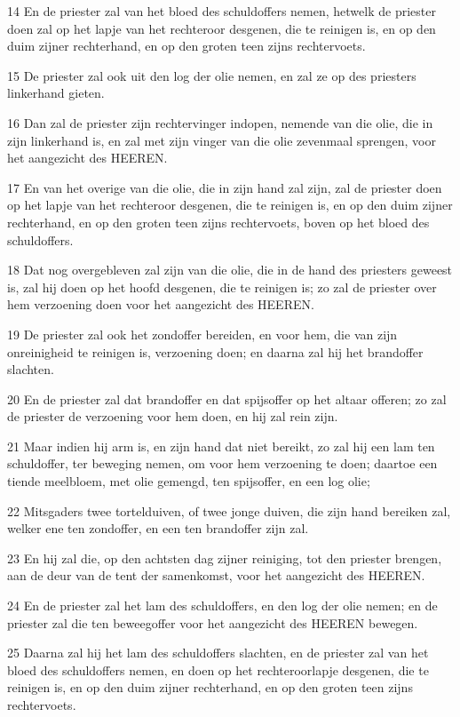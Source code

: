 \par 14 En de priester zal van het bloed des schuldoffers nemen, hetwelk de priester doen zal op het lapje van het rechteroor desgenen, die te reinigen is, en op den duim zijner rechterhand, en op den groten teen zijns rechtervoets.
\par 15 De priester zal ook uit den log der olie nemen, en zal ze op des priesters linkerhand gieten.
\par 16 Dan zal de priester zijn rechtervinger indopen, nemende van die olie, die in zijn linkerhand is, en zal met zijn vinger van die olie zevenmaal sprengen, voor het aangezicht des HEEREN.
\par 17 En van het overige van die olie, die in zijn hand zal zijn, zal de priester doen op het lapje van het rechteroor desgenen, die te reinigen is, en op den duim zijner rechterhand, en op den groten teen zijns rechtervoets, boven op het bloed des schuldoffers.
\par 18 Dat nog overgebleven zal zijn van die olie, die in de hand des priesters geweest is, zal hij doen op het hoofd desgenen, die te reinigen is; zo zal de priester over hem verzoening doen voor het aangezicht des HEEREN.
\par 19 De priester zal ook het zondoffer bereiden, en voor hem, die van zijn onreinigheid te reinigen is, verzoening doen; en daarna zal hij het brandoffer slachten.
\par 20 En de priester zal dat brandoffer en dat spijsoffer op het altaar offeren; zo zal de priester de verzoening voor hem doen, en hij zal rein zijn.
\par 21 Maar indien hij arm is, en zijn hand dat niet bereikt, zo zal hij een lam ten schuldoffer, ter beweging nemen, om voor hem verzoening te doen; daartoe een tiende meelbloem, met olie gemengd, ten spijsoffer, en een log olie;
\par 22 Mitsgaders twee tortelduiven, of twee jonge duiven, die zijn hand bereiken zal, welker ene ten zondoffer, en een ten brandoffer zijn zal.
\par 23 En hij zal die, op den achtsten dag zijner reiniging, tot den priester brengen, aan de deur van de tent der samenkomst, voor het aangezicht des HEEREN.
\par 24 En de priester zal het lam des schuldoffers, en den log der olie nemen; en de priester zal die ten beweegoffer voor het aangezicht des HEEREN bewegen.
\par 25 Daarna zal hij het lam des schuldoffers slachten, en de priester zal van het bloed des schuldoffers nemen, en doen op het rechteroorlapje desgenen, die te reinigen is, en op den duim zijner rechterhand, en op den groten teen zijns rechtervoets.
